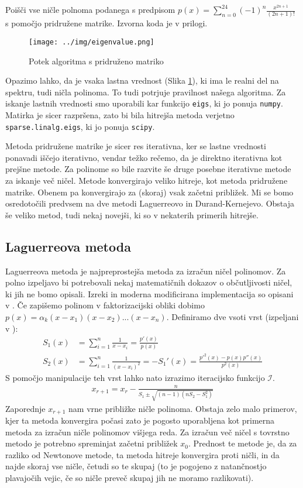\begin{primer}
    Poišči vse ničle polnoma podanega s predpisom $p(x) = \sum_{n=0}^{24} (-1)^n \frac{x^{2n+1}}{(2n+1)!}$ s pomočjo pridružene matrike. Izvorna koda je v prilogi.
    \begin{figure}[H]
    \centering
    \texttt{[image: ../img/eigenvalue.png]}
    \caption{Potek algoritma s pridruženo matriko}
    \label{fig:companionmatrix}
\end{figure}
Opazimo lahko, da je vsaka lastna vrednost (Slika \ref{fig:companionmatrix}), ki ima le realni del na spektru, tudi ničla polinoma. To tudi potrjuje pravilnost našega algoritma. Za iskanje lastnih vrednosti smo uporabili kar funkcijo \texttt{eigs}, ki jo ponuja \texttt{numpy}. Matirka je sicer razpršena, zato bi bila hitrejša metoda verjetno \texttt{sparse.linalg.eigs}, ki jo ponuja \texttt{scipy}.
\end{primer}
Metoda pridružene matrike je sicer res iterativna, ker se lastne vrednosti ponavadi iščejo iterativno, vendar težko rečemo, da je direktno iterativna kot prejšne metode. Za polinome so bile razvite še druge posebne iterativne metode za iskanje več ničel. Metode konvergirajo veliko hitreje, kot metoda pridružene matrike. Obenem pa konvergirajo za (skoraj) vsak začetni približek. Mi se bomo osredotočili predvsem na dve metodi Laguerreovo in Durand-Kernejevo. Obstaja še veliko metod, tudi nekaj novejši, ki so v nekaterih primerih hitrejše.
\subsection{Laguerreova metoda}
Laguerreova metoda je najpreprostejša metoda za izračun ničel polinomov. Za polno izpeljavo bi potrebovali nekaj matematičnih dokazov o občutljivosti ničel, ki jih ne bomo opisali. Izreki in moderna modificirana implementacija so opisani v \cite{lagguerrmetoda}. Če zapišemo polinom v faktorizacijski obliki dobimo $p(x) = \alpha_k (x - x_1)(x - x_2)...(x - x_n)$. Definiramo dve vsoti vrst (izpeljani v \cite{Plestenjak2010}):
\begin{align}
    S_1(x) &= \sum_{i=1}^n \frac{1}{x-x_i} = \frac{p'(x)}{p(x)}\\
    S_2(x) &= \sum_{i=1}^n \frac{1}{(x-x_i)^2} = -S_1'(x) = \frac{p'^2(x) - p(x)p''(x)}{p^2(x)}
\end{align}
S pomočjo manipulacije teh vrst \cite{Plestenjak2010} lahko nato izrazimo iteracijsko funkcijo $\mathcal{I}$.
\begin{align}
    x_{r+1} = x_r - \frac{n}{S_1 \pm \sqrt{(n-1)(nS_2-S_1^2)}}
\end{align}
Zaporednje $x_{r+1}$ nam vrne približke ničle polinoma. Obstaja zelo malo primerov, kjer ta metoda konvergira počasi zato je pogosto uporabljena kot primerna metoda za izračun ničle polinomov višjega reda. Za izračun več ničel s tovrstno metodo je potrebno spreminjat začetni približek $x_0$. Prednost te metode je, da za razliko od Newtonove metode, ta metoda hitreje konvergira proti ničli, in da najde skoraj vse ničle, četudi so te skupaj (to je pogojeno z natančnostjo plavajočih vejic, če so ničle preveč skupaj jih ne moramo razlikovati).

